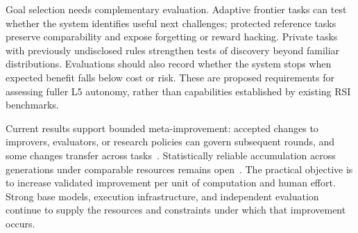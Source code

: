 Goal selection needs complementary evaluation. Adaptive frontier tasks can test whether the system identifies useful next challenges; protected reference tasks preserve comparability and expose forgetting or reward hacking. Private tasks with previously undisclosed rules strengthen tests of discovery beyond familiar distributions. Evaluations should also record whether the system stops when expected benefit falls below cost or risk. These are proposed requirements for assessing fuller L5 autonomy, rather than capabilities established by existing RSI benchmarks.

Current results support bounded meta-improvement: accepted changes to improvers, evaluators, or research policies can govern subsequent rounds, and some changes transfer across tasks~\cite{zelikman2024stop,zhang2026hyperagents,iacob2026redqueen}. Statistically reliable accumulation across generations under comparable resources remains open~\cite{zhang2026hyperagents,weco2026aide2}. The practical objective is to increase validated improvement per unit of computation and human effort. Strong base models, execution infrastructure, and independent evaluation continue to supply the resources and constraints under which that improvement occurs.

\begin{center}
\end{center}
